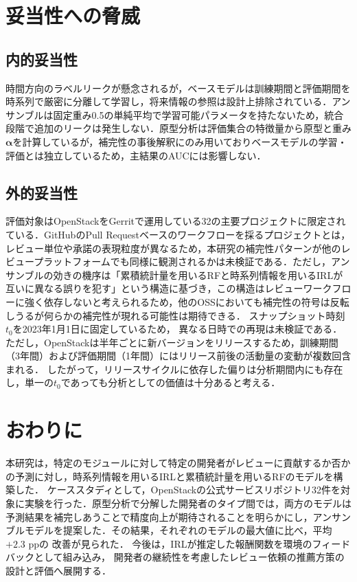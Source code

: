\documentclass[submit,noauthor,ses,dvipdfmx]{ipsj}
\begin{document}
\section{妥当性への脅威}\label{sec:validity}
\vspace{-2mm}
\subsection{内的妥当性}
時間方向のラベルリークが懸念されるが，ベースモデルは訓練期間と評価期間を時系列で厳密に分離して学習し，将来情報の参照は設計上排除されている．アンサンブルは固定重み0.5の単純平均で学習可能パラメータを持たないため，統合段階で追加のリークは発生しない．原型分析は評価集合の特徴量から原型と重み$\bm{\alpha}$を計算しているが，補完性の事後解釈にのみ用いておりベースモデルの学習・評価とは独立しているため，主結果のAUCには影響しない．
\vspace{-6mm}
\subsection{外的妥当性}
評価対象はOpenStackをGerritで運用している32の主要プロジェクトに限定されている．GitHubのPull Requestベースのワークフローを採るプロジェクトとは，レビュー単位や承諾の表現粒度が異なるため，本研究の補完性パターンが他のレビュープラットフォームでも同様に観測されるかは未検証である．ただし，アンサンブルの効きの機序は「累積統計量を用いるRFと時系列情報を用いるIRLが互いに異なる誤りを犯す」という構造に基づき，この構造はレビューワークフローに強く依存しないと考えられるため，他のOSSにおいても補完性の符号は反転しうるが何らかの補完性が現れる可能性は期待できる．
スナップショット時刻$t_0$を2023年1月1日に固定しているため，
異なる日時での再現は未検証である．ただし，OpenStackは半年ごとに新バージョンをリリースするため，訓練期間（3年間）および評価期間（1年間）にはリリース前後の活動量の変動が複数回含まれる．
したがって，リリースサイクルに依存した偏りは分析期間内にも存在し，単一の$t_0$であっても分析としての価値は十分あると考える．
\vspace{-1mm}
\section{おわりに}\label{sec:conclusion}
\vspace{-2mm}
本研究は，特定のモジュールに対して特定の開発者がレビューに貢献するか否かの予測に対し，時系列情報を用いるIRLと累積統計量を用いるRFのモデルを構築した．
ケーススタディとして，OpenStackの公式サービスリポジトリ32件を対象に実験を行った．原型分析で分解した開発者のタイプ間では，両方のモデルは予測結果を補完しあうことで精度向上が期待されることを明らかにし，アンサンブルモデルを提案した．その結果，それぞれのモデルの最大値に比べ，平均$+2.3$ ppの
改善が見られた．
今後は，IRLが推定した報酬関数を環境のフィードバックとして組み込み，
開発者の継続性を考慮したレビュー依頼の推薦方策の設計と評価へ展開する．
\end{document}
